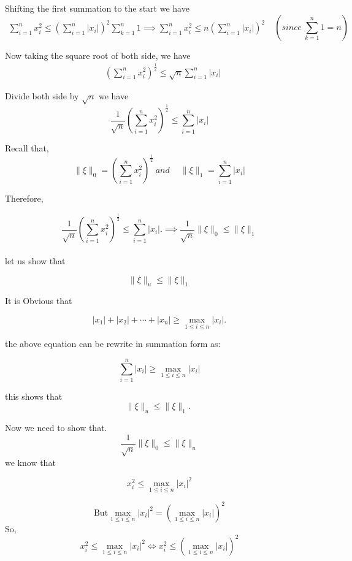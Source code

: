 \documentclass{article}
\begin{document}
Shifting the first summation to the start we have
$$
\begin{gathered}
\sum_{i=1}^{n} x_{i}^{2} \leq\left(\sum_{i=1}^{n}\left|x_{i}\right|\right)^{2} \sum_{k=1}^{n} 1 \implies
\sum_{i=1}^{n} x_{i}^{2} \leq n\left(\sum_{i=1}^{n}\left|x_{i}\right|\right)^{2}  
\end{gathered}~ ~~\left(since ~\sum_{k=1}^{n} 1=n\right)
$$

Now taking the square root of both side, we have
$$
\begin{aligned}
& \left(\sum_{i=1}^{n} x_{i}^{2}\right)^{\frac{1}{2}} \leq \sqrt{n} \sum_{i=1}^{n}\left|x_{i}\right|
\end{aligned}
$$

Divide both side by $\sqrt{n}$ we have
$$ \frac{1}{\sqrt{n}}\left(\sum_{i=1}^{n} x_{i}^{2}\right)^{\frac{1}{2}} \leq \sum_{i=1}^{n}\left|x_{i}\right|
$$

Recall that, $$\|\xi\|_{0}=\left(\sum_{i=1}^{n} x_{i}^{2}\right)^{\frac{1}{2}} ~and ~\quad\|\xi\|_{1}=\sum_{i=1}^{n}\left|x_{i}\right|$$

Therefore,

$$\frac{1}{\sqrt{n}}\left(\sum_{i=1}^{n} x_{i}^{2}\right)^{\frac{1}{2}} \leq \sum_{i=1}^{n}\left|x_{i}\right| .
\implies
\frac{1}{\sqrt{n}}\|\xi\|_{0} \leq\|\xi\|_{1}
$$\\

let us  show that

$$
\|\xi\|_{u} \leq\|\xi\|_{1}
$$

It is Obvious that

$$
\left|x_{1}\right|+\left|x_{2}\right|+\cdots+\left|x_{n}\right| \geq \max _{1 \leq i \leq n}\left|x_{i}\right| .
$$

the above equation can be rewrite in summation form as:

$$
\sum_{i=1}^{n}\left|x_{i}\right| \geq \max _{1 \leq i \leq n}\left|x_{i}\right|
$$

this shows that
$$
\|\xi\|_{u} \leq\|\xi\|_{1} \text {. }
$$

Now we need to show that.
$$
\frac{1}{\sqrt{n}}\|\xi\|_{0} \leq\|\xi\|_{u}
$$
we know that

$$
x_{i}^{2} \leq \max _{1 \leq i \leq n}\left|x_{i}\right|^{2}
$$

$$ \text{But} \max _{1 \leq i \leq n}\left|x_{i}\right|^{2}=\left(\max _{1 \leq i \leq n}\left|x_{i}\right|\right)^{2}$$
So, $$
x_{i}^{2} \leq \max _{1 \leq i \leq n}\left|x_{i}\right|^{2} \iff x_{i}^{2} \leq\left(\max _{1 \leq i \leq n}\left|x_{i}\right|\right)^{2}
$$
\end{document}
